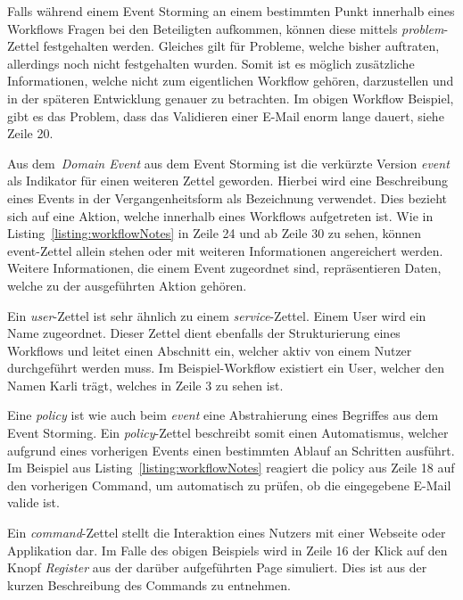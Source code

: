 
Falls während einem Event Storming an einem bestimmten Punkt innerhalb eines Workflows Fragen bei den Beteiligten aufkommen,
können diese mittels \textit{problem}-Zettel festgehalten werden.
Gleiches gilt für Probleme, welche bisher auftraten, allerdings noch nicht festgehalten wurden.
Somit ist es möglich zusätzliche Informationen, welche nicht zum eigentlichen Workflow gehören, darzustellen und in der
späteren Entwicklung genauer zu betrachten.
Im obigen Workflow Beispiel, gibt es das Problem, dass das Validieren einer E-Mail enorm lange dauert, siehe Zeile 20.


Aus dem~\textit{Domain Event} aus dem Event Storming ist die verkürzte Version \textit{event} als Indikator für einen weiteren Zettel geworden.
Hierbei wird eine Beschreibung eines Events in der Vergangenheitsform als Bezeichnung verwendet.
Dies bezieht sich auf eine Aktion, welche innerhalb eines Workflows aufgetreten ist.
Wie in Listing~\ref{listing:workflowNotes} in Zeile 24 und ab Zeile 30 zu sehen, können event-Zettel allein stehen oder mit weiteren Informationen
angereichert werden.
Weitere Informationen, die einem Event zugeordnet sind, repräsentieren Daten, welche zu der ausgeführten Aktion gehören.


Ein \textit{user}-Zettel ist sehr ähnlich zu einem \textit{service}-Zettel.
Einem User wird ein Name zugeordnet.
Dieser Zettel dient ebenfalls der Strukturierung eines Workflows und leitet einen Abschnitt ein, welcher aktiv von einem
Nutzer durchgeführt werden muss.
Im Beispiel-Workflow existiert ein User, welcher den Namen Karli trägt, welches in Zeile 3 zu sehen ist.


Eine \textit{policy} ist wie auch beim \textit{event} eine Abstrahierung eines Begriffes aus dem Event Storming.
Ein \textit{policy}-Zettel beschreibt somit einen Automatismus, welcher aufgrund eines vorherigen Events einen bestimmten
Ablauf an Schritten ausführt.
Im Beispiel aus Listing~\ref{listing:workflowNotes} reagiert die policy aus Zeile 18 auf den vorherigen Command, um automatisch zu prüfen,
ob die eingegebene E-Mail valide ist.


Ein \textit{command}-Zettel stellt die Interaktion eines Nutzers mit einer Webseite oder Applikation dar.
Im Falle des obigen Beispiels wird in Zeile 16 der Klick auf den Knopf \textit{Register} aus der darüber aufgeführten Page simuliert.
Dies ist aus der kurzen Beschreibung des Commands zu entnehmen.

